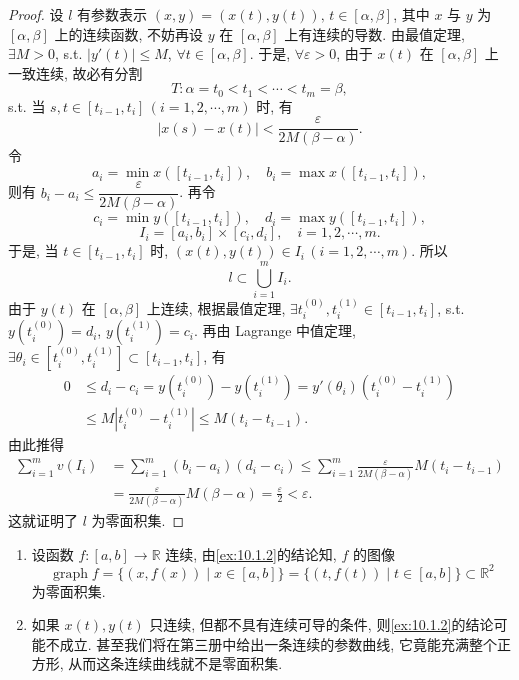 \begin{proof}
设 $l$ 有参数表示 $(x, y) = (x(t), y(t)),\, t \in [\alpha, \beta]$, 其中 $x$ 与 $y$ 为 $[\alpha, \beta]$ 上的连续函数, 不妨再设 $y$ 在 $[\alpha, \beta]$ 上有连续的导数. 由最值定理, $\exists M > 0$, s.t. $|y'(t)| \leqslant M$, $\forall t \in [\alpha, \beta]$. 于是, $\forall \varepsilon > 0$, 由于 $x(t)$ 在 $[\alpha, \beta]$ 上一致连续, 故必有分割
\[
  T\colon \alpha = t_{0} < t_{1} < \cdots < t_{m} = \beta,
\]
s.t. 当 $s, t \in [t_{i-1}, t_i]\, (i = 1, 2, \cdots, m)$ 时, 有
\[
  |x(s) - x(t)| < \frac{\varepsilon}{2M(\beta - \alpha)}.
\]
令
\[
  a_{i} = \min x([t_{i-1}, t_{i}]), \quad b_{i} = \max x([t_{i-1}, t_{i}]),
\]
则有 $b_{i} - a_{i} \leqslant \dfrac{\varepsilon}{2M(\beta - \alpha)}$. 再令
\[
  c_{i} = \min y([t_{i-1}, t_{i}]), \quad d_{i} = \max y([t_{i-1}, t_{i}]),
\]
\[
  I_{i} = [a_{i}, b_{i}] \times [c_{i}, d_{i}], \quad i = 1, 2, \cdots, m.
\]
于是, 当 $t \in [t_{i-1}, t_i]$ 时, $(x(t), y(t)) \in I_i\, (i = 1, 2, \cdots, m)$. 所以
\[
  l \subset \bigcup_{i=1}^{m} I_{i}.
\]
由于 $y(t)$ 在 $[\alpha, \beta]$ 上连续, 根据最值定理, $\exists t_{i}^{(0)}, t_{i}^{(1)} \in [t_{i-1}, t_{i}]$, s.t. $y(t_{i}^{(0)}) = d_{i}$, $y(t_{i}^{(1)}) = c_{i}$. 再由 Lagrange 中值定理, $\exists \theta_{i} \in [t_{i}^{(0)}, t_{i}^{(1)}] \subset [t_{i-1}, t_{i}]$, 有
\begin{align*}
  0 &\leqslant d_{i} - c_{i} = y(t_{i}^{(0)}) - y(t_{i}^{(1)}) = y'(\theta_{i})(t_{i}^{(0)} - t_{i}^{(1)}) \\
    &\leqslant M |t_{i}^{(0)} - t_{i}^{(1)}| \leqslant M(t_{i} - t_{i-1}).
\end{align*}
由此推得
\begin{align*}
  \sum_{i=1}^{m} v(I_{i}) &= \sum_{i=1}^{m}(b_{i} - a_{i})(d_{i} - c_{i}) \leqslant \sum_{i=1}^{m} \frac{\varepsilon}{2M(\beta - \alpha)} M(t_{i} - t_{i-1}) \\
  &= \frac{\varepsilon}{2M(\beta - \alpha)} M(\beta - \alpha) = \frac{\varepsilon}{2} < \varepsilon.
\end{align*}
这就证明了 $l$ 为零面积集.
\end{proof}

\begin{remark}\label{rem:10.1.1}
\begin{enumerate}
  \item 设函数 $f\colon [a, b] \to \mathbb{R}$ 连续, 由\cref{ex:10.1.2}的结论知, $f$ 的图像
  \[
    \operatorname{graph} f = \{(x, f(x)) \mid x \in [a, b]\} = \{(t, f(t)) \mid t \in [a, b]\} \subset \mathbb{R}^{2}
  \]
  为零面积集.
  \item 如果 $x(t), y(t)$ 只连续, 但都不具有连续可导的条件, 则\cref{ex:10.1.2}的结论可能不成立. 甚至我们将在第三册中给出一条连续的参数曲线, 它竟能充满整个正方形, 从而这条连续曲线就不是零面积集.
\end{enumerate}
\end{remark}

